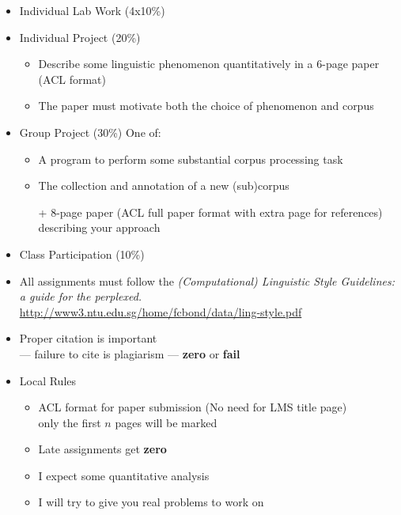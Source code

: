 \documentclass[a4paper,landscape,headrule,footrule,xetex]{foils}
\begin{document}


\begin{itemize}
\item Individual Lab Work (4x10\%)
\item Individual Project (20\%) 
  \begin{itemize}
  \item  Describe some linguistic phenomenon quantitatively in a 6-page paper (ACL format)
  \item The paper must motivate both the choice of phenomenon and corpus
  \end{itemize}
\item Group Project (30\%) One of:
  \begin{itemize}
  \item A program to perform some substantial corpus processing task
  \item The collection and annotation of a new (sub)corpus
  \item[+]     8-page paper (ACL full paper format with extra page for references) describing your approach
  \end{itemize}
\item Class Participation  (10\%)
\end{itemize}



\begin{itemize}
\item All assignments must follow the \textit{(Computational)
    Linguistic Style Guidelines: a guide for the perplexed. } \\
  \url{http://www3.ntu.edu.sg/home/fcbond/data/ling-style.pdf}
\item Proper citation is important 
    \\ --- failure to cite is plagiarism --- \textbf{zero} or \textbf{fail}
\item Local Rules
  \begin{itemize}
  \item ACL format for paper submission (No need for LMS title page)
    \\ only the first $n$ pages will be marked
  \item Late assignments get \textbf{zero}
  \item I expect some quantitative analysis
  \item I will try to give you real problems to work on
  \end{itemize}
\end{itemize}
\end{document}
